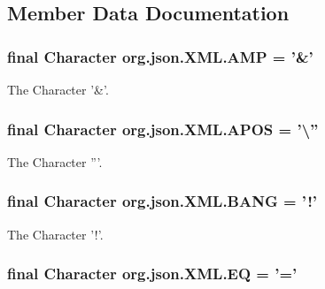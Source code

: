 \subsection{Member Data Documentation}
\hypertarget{classorg_1_1json_1_1XML_a2ed9b74a6dcc1a3833460cb35b72a8e2}{
\subsubsection[{A\-M\-P}]{\setlength{\rightskip}{0pt plus 5cm}final Character org.\-json.\-X\-M\-L.\-A\-M\-P = '\&'\hspace{0.3cm}{\ttfamily [static]}}}\label{classorg_1_1json_1_1XML_a2ed9b74a6dcc1a3833460cb35b72a8e2}
The Character '\&'. \hypertarget{classorg_1_1json_1_1XML_afc1bccac3be808ee0cc80e6c5261226a}{
\subsubsection[{A\-P\-O\-S}]{\setlength{\rightskip}{0pt plus 5cm}final Character org.\-json.\-X\-M\-L.\-A\-P\-O\-S = '\textbackslash{}''\hspace{0.3cm}{\ttfamily [static]}}}\label{classorg_1_1json_1_1XML_afc1bccac3be808ee0cc80e6c5261226a}
The Character '''. \hypertarget{classorg_1_1json_1_1XML_a15eadac312b9e5b2d8590be2d92cc24f}{
\subsubsection[{B\-A\-N\-G}]{\setlength{\rightskip}{0pt plus 5cm}final Character org.\-json.\-X\-M\-L.\-B\-A\-N\-G = '!'\hspace{0.3cm}{\ttfamily [static]}}}\label{classorg_1_1json_1_1XML_a15eadac312b9e5b2d8590be2d92cc24f}
The Character '!'. \hypertarget{classorg_1_1json_1_1XML_a79c30d409011e7c5bbffe3a9dd487b19}{
\subsubsection[{E\-Q}]{\setlength{\rightskip}{0pt plus 5cm}final Character org.\-json.\-X\-M\-L.\-E\-Q = '='\hspace{0.3cm}{\ttfamily [static]}}}\label{classorg_1_1json_1_1XML_a79c30d409011e7c5bbffe3a9dd487b19}
